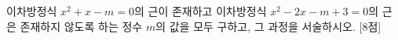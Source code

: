 이차방정식 $x^2+x-m=0$의 근이 존재하고 이차방정식 $x^2-2x-m+3=0$의 근은 존재하지 않도록 하는 정수 $m$의 값을 모두 구하고, 그 과정을 서술하시오. \mbox{[8점]}
